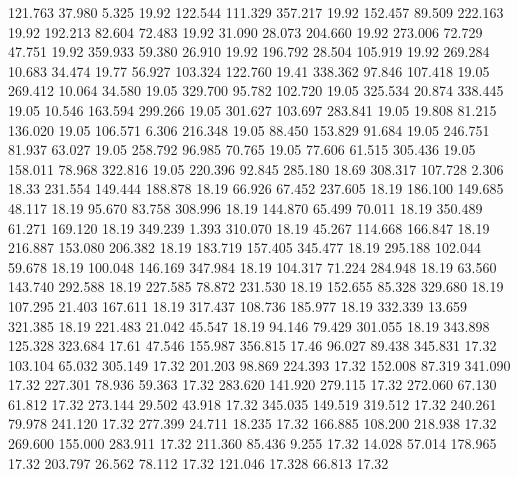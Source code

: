  121.763   37.980    5.325        19.92
 122.544  111.329  357.217        19.92
 152.457   89.509  222.163        19.92
 192.213   82.604   72.483        19.92
  31.090   28.073  204.660        19.92
 273.006   72.729   47.751        19.92
 359.933   59.380   26.910        19.92
 196.792   28.504  105.919        19.92
 269.284   10.683   34.474        19.77
  56.927  103.324  122.760        19.41
 338.362   97.846  107.418        19.05
 269.412   10.064   34.580        19.05
 329.700   95.782  102.720        19.05
 325.534   20.874  338.445        19.05
  10.546  163.594  299.266        19.05
 301.627  103.697  283.841        19.05
  19.808   81.215  136.020        19.05
 106.571    6.306  216.348        19.05
  88.450  153.829   91.684        19.05
 246.751   81.937   63.027        19.05
 258.792   96.985   70.765        19.05
  77.606   61.515  305.436        19.05
 158.011   78.968  322.816        19.05
 220.396   92.845  285.180        18.69
 308.317  107.728    2.306        18.33
 231.554  149.444  188.878        18.19
  66.926   67.452  237.605        18.19
 186.100  149.685   48.117        18.19
  95.670   83.758  308.996        18.19
 144.870   65.499   70.011        18.19
 350.489   61.271  169.120        18.19
 349.239    1.393  310.070        18.19
  45.267  114.668  166.847        18.19
 216.887  153.080  206.382        18.19
 183.719  157.405  345.477        18.19
 295.188  102.044   59.678        18.19
 100.048  146.169  347.984        18.19
 104.317   71.224  284.948        18.19
  63.560  143.740  292.588        18.19
 227.585   78.872  231.530        18.19
 152.655   85.328  329.680        18.19
 107.295   21.403  167.611        18.19
 317.437  108.736  185.977        18.19
 332.339   13.659  321.385        18.19
 221.483   21.042   45.547        18.19
  94.146   79.429  301.055        18.19
 343.898  125.328  323.684        17.61
  47.546  155.987  356.815        17.46
  96.027   89.438  345.831        17.32
 103.104   65.032  305.149        17.32
 201.203   98.869  224.393        17.32
 152.008   87.319  341.090        17.32
 227.301   78.936   59.363        17.32
 283.620  141.920  279.115        17.32
 272.060   67.130   61.812        17.32
 273.144   29.502   43.918        17.32
 345.035  149.519  319.512        17.32
 240.261   79.978  241.120        17.32
 277.399   24.711   18.235        17.32
 166.885  108.200  218.938        17.32
 269.600  155.000  283.911        17.32
 211.360   85.436    9.255        17.32
  14.028   57.014  178.965        17.32
 203.797   26.562   78.112        17.32
 121.046   17.328   66.813        17.32
